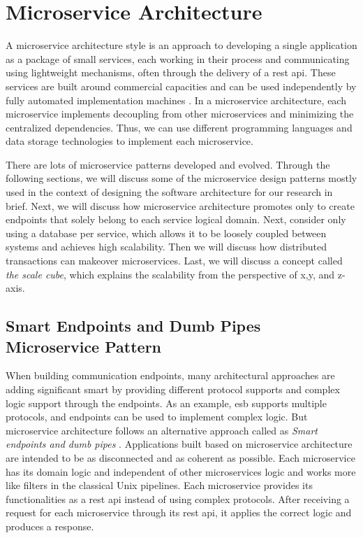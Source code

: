 \section{Microservice Architecture}
\label{se:microservice}

A microservice architecture style is an approach to developing a single application as a package of small services, each working in their process and communicating using lightweight mechanisms, often through the delivery of a \acrfull{rest} \acrshort{api}. These services are built around commercial capacities and can be used independently by fully automated implementation machines \cite{LewisMicroservices}. In a microservice architecture, each microservice implements decoupling from other microservices and minimizing the centralized dependencies. Thus, we can use different programming languages and data storage technologies to implement each microservice.

There are lots of microservice patterns developed and evolved. Through the following sections, we will discuss some of the microservice design patterns mostly used in the context of designing the software architecture for our research in brief. Next, we will discuss how microservice architecture promotes only to create endpoints that solely belong to each service logical domain. Next, consider only using a database per service, which allows it to be loosely coupled between systems and achieves high scalability. Then we will discuss how distributed transactions can makeover microservices. Last, we will discuss a concept called \emph{the scale cube}, which explains the scalability from the perspective of x,y, and z-axis.


\subsection{Smart Endpoints and Dumb Pipes  Microservice Pattern}
\label{subse:dumb_pipes}

When building communication endpoints, many architectural approaches are adding significant smart by providing different protocol supports and complex logic support through the endpoints. As an example, \acrshort{esb} supports multiple protocols, and endpoints can be used to implement complex logic. But microservice architecture follows an alternative approach called as \emph{Smart endpoints and dumb pipes} \cite{LewisMicroservicesPipes}. Applications built based on microservice architecture are intended to be as disconnected and as coherent as possible. Each microservice has its domain logic and independent of other microservices logic and works more like filters in the classical Unix pipelines. Each microservice provides its functionalities as a \acrshort{rest} \acrshort{api} instead of using complex protocols. After receiving a request for each microservice through its \acrshort{rest} \acrshort{api}, it applies the correct logic and produces a response.

